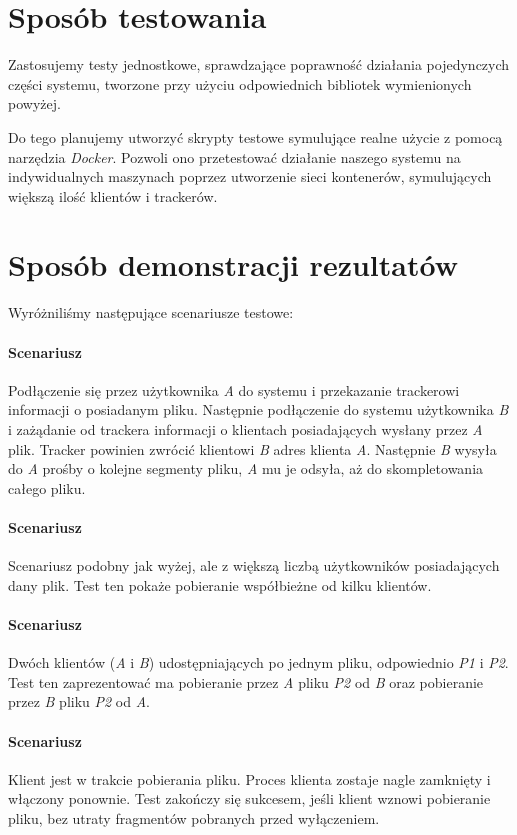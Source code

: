 \documentclass[11pt]{article}
\begin{document}
\section{Sposób testowania}
Zastosujemy testy jednostkowe, sprawdzające poprawność działania pojedynczych części systemu, tworzone przy użyciu odpowiednich bibliotek wymienionych powyżej.

Do tego planujemy utworzyć skrypty testowe symulujące realne użycie z pomocą narzędzia \textsl{Docker}. Pozwoli ono przetestować działanie naszego systemu na indywidualnych maszynach poprzez utworzenie sieci kontenerów, symulujących większą ilość klientów i trackerów.

\newcommand{\RomanNumeralCaps}[1]
    {\MakeUppercase{\romannumeral #1}}
\section{Sposób demonstracji rezultatów}
Wyróżniliśmy następujące scenariusze testowe:
\paragraph{Scenariusz \RomanNumeralCaps{1}} Podłączenie się przez użytkownika \textsl{A} do systemu i przekazanie trackerowi informacji o posiadanym pliku. Następnie podłączenie do systemu użytkownika \textsl{B} i zażądanie od trackera informacji o klientach posiadających wysłany przez \textsl{A} plik. Tracker powinien zwrócić klientowi \textsl{B} adres klienta \textsl{A}. Następnie \textsl{B} wysyła do \textsl{A} prośby o kolejne segmenty pliku, \textsl{A} mu je odsyła, aż do skompletowania całego pliku.
\paragraph{Scenariusz \RomanNumeralCaps{2}} Scenariusz podobny jak wyżej, ale z większą liczbą użytkowników posiadających dany plik. Test ten pokaże pobieranie współbieżne od kilku klientów.
\paragraph{Scenariusz \RomanNumeralCaps{3}} Dwóch klientów (\textsl{A} i \textsl{B}) udostępniających po jednym pliku, odpowiednio \textsl{P1} i \textsl{P2}. Test ten zaprezentować ma pobieranie przez \textsl{A} pliku \textsl{P2} od \textsl{B} oraz pobieranie przez \textsl{B} pliku \textsl{P2} od \textsl{A}.
\paragraph{Scenariusz \RomanNumeralCaps{4}} Klient jest w trakcie pobierania pliku. Proces klienta zostaje nagle zamknięty i włączony ponownie. Test zakończy się sukcesem, jeśli klient wznowi pobieranie pliku, bez utraty fragmentów pobranych przed wyłączeniem.
\end{document}
